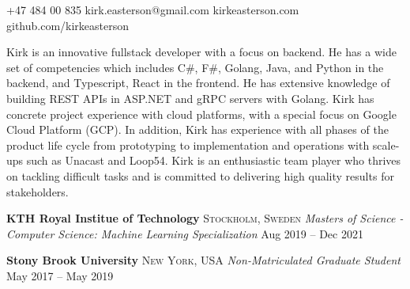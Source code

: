 \documentclass[10pt,letterpaper]{article}
\begin{document}


\begin{center}\spacedhrule{-.6em}{-.6em}\end{center}
 \hfill \small +47 484 00 835 \hfill {} \hfill kirk.easterson@gmail.com \hfill {} \hfill kirkeasterson.com \hfill {} \hfill github.com/kirkeasterson \hfill {}
\begin{center}\spacedhrule{-.4em}{0em}\end{center}



Kirk is an innovative fullstack developer with a focus on backend. He has a wide set of competencies which includes C\#, F\#, Golang, Java, and Python in the backend, and Typescript, React in the frontend. He has extensive knowledge of building REST APIs in ASP.NET and gRPC servers with Golang. Kirk has concrete project experience with cloud platforms, with a special focus on Google Cloud Platform (GCP). In addition, Kirk has experience with all phases of the product life cycle from prototyping to implementation and operations with scale-ups such as Unacast and Loop54. Kirk is an enthusiastic team player who thrives on tackling difficult tasks and is committed to delivering high quality results for stakeholders.


\spacedhrule{0.6em}{-0.7em}







\headedsection
{\textbf{KTH Royal Institue of Technology}}
{\textsc{Stockholm, Sweden}} {
	\headedsubsection
	{\textit{Masters of Science - Computer Science: Machine Learning Specialization}}
	{Aug 2019 -- Dec 2021}
	{\bodytext{}}
}
\vspace{-5mm}


\headedsection
{\textbf{Stony Brook University}}
{\textsc{New York, USA}} {
	\headedsubsection
	{\textit{Non-Matriculated Graduate Student}}
	{May 2017 -- May 2019}
	{\bodytext{}}
}
\vspace{-5mm}
\end{document}
